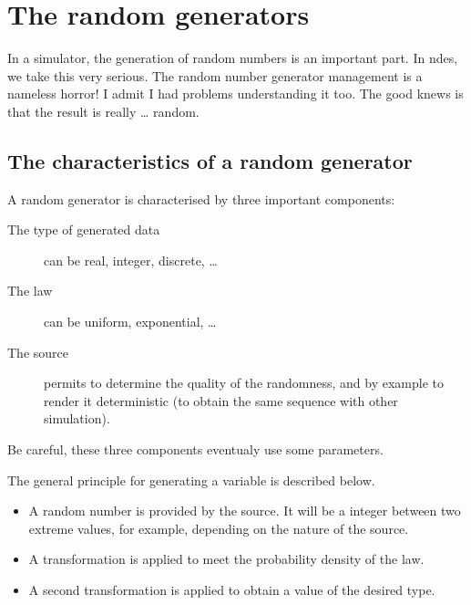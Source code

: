 %

\section{The random generators}
\label{section:random-generator}

  In a simulator, the generation of random numbers is an important part. 
In {\sc ndes}, we take this very serious. The random number generator 
management is a nameless horror! I admit I had problems understanding it too. 
The good knews is that the result is really \ldots{} random.

%
\subsection{The characteristics of a random generator}

 A random generator is characterised by three important components:

\begin{description}
   \item[The type of generated data] can be real, integer,
     discrete, \ldots
   \item[The law] can be uniform, exponential, \ldots
   \item[The source] permits to determine the quality of the randomness, and 
by example to render it deterministic (to obtain the same sequence with other 
simulation).
\end{description}

  Be careful, these three components eventualy use some parameters.
  
    The general principle for generating a variable is described below.

\begin{itemize}
   \item A random number is provided by the source. It will be a
      integer between two extreme values​​, for example, depending on
      the nature of the source.
   \item A transformation is applied to meet the probability density 
      of the law.
   \item A second transformation is applied to obtain a
      value of the desired type.
\end{itemize}

